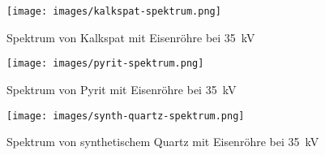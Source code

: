 \begin{figure}[h!]
    \centering
    \texttt{[image: images/kalkspat-spektrum.png]}
    \caption{Spektrum von Kalkspat  mit Eisenr\"ohre bei \SI{35}{\kilo\volt}}
    \label{fig:spektrum:kalkspat}
\end{figure}

\begin{figure}[h!]
    \centering
    \texttt{[image: images/pyrit-spektrum.png]}
    \caption{Spektrum von Pyrit  mit Eisenr\"ohre bei \SI{35}{\kilo\volt}}
    \label{fig:spektrum:pyrit}
\end{figure}

\begin{figure}[h!]
    \centering
    \texttt{[image: images/synth-quartz-spektrum.png]}
    \caption{Spektrum von synthetischem Quartz  mit Eisenr\"ohre bei \SI{35}{\kilo\volt}}
    \label{fig:spektrum:synth_quartz}
\end{figure}

